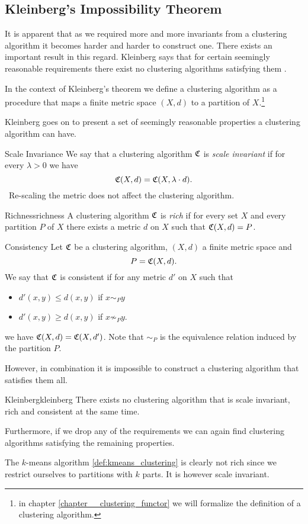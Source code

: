 \subsection{Kleinberg's Impossibility Theorem}
It is apparent that as we required more and more invariants from a clustering algorithm it becomes harder and harder to construct one.
There exists an important result in this regard.
Kleinberg says that for certain seemingly reasonable requirements there exist no clustering algorithms satisfying them \cite{Kleinberg2002}.

In the context of Kleinberg's theorem we define a clustering algorithm as a procedure that maps a finite metric space $(X,d)$ to a partition of $X$.\footnote{in chapter \ref{chapter__clustering_functor} we will formalize the definition of a clustering algorithm.}

Kleinberg goes on to present a set of seemingly reasonable properties a clustering algorithm can have.

\begin{definition}{Scale Invariance}{}
We say that a clustering algorithm $\mathfrak{C}$ is \emph{scale invariant} if for every $\lambda > 0$ we have
$$
\mathfrak{C}(X,d) = \mathfrak{C}(X, \lambda \cdot d).
$$
\Ie\ Re-scaling the metric does not affect the clustering algorithm.
\end{definition}

\begin{definition}{Richness}{richness}
A clustering algorithm $\mathfrak{C}$ is \emph{rich} if for every set $X$ and every partition $P$ of $X$ there exists a metric $d$ on $X$ such that $\mathfrak{C}(X,d) = P$.
\end{definition}

\begin{definition}{Consistency}{}
Let $\mathfrak{C}$ be a clustering algorithm, $(X,d)$ a finite metric space and
$$
P = \mathfrak{C}(X,d).
$$
We say that $\mathfrak{C}$ is consistent if for any metric $d'$ on $X$ such that
\begin{itemize}
    \item $d'(x,y) \leq d(x,y)$ if $x\sim_P y$
    \item $d'(x,y) \geq d(x,y)$ if $x \not\sim_P y$.
\end{itemize}
we have $\mathfrak{C}(X,d) = \mathfrak{C}(X,d')$. Note that $\sim_P$ is the equivalence relation induced by the partition $P$.
\end{definition}


However, in combination it is impossible to construct a clustering algorithm that satisfies them all.


\begin{theorem}{Kleinberg}{kleinberg}
There exists no clustering algorithm that is scale invariant, rich and consistent at the same time.
\end{theorem}

Furthermore, if we drop any of the requirements we can again find clustering algorithms satisfying the remaining properties.

The $k$-means algorithm \ref{def:kmeans_clustering} is clearly not rich since we restrict ourselves to partitions with $k$ parts. It is however scale invariant.

